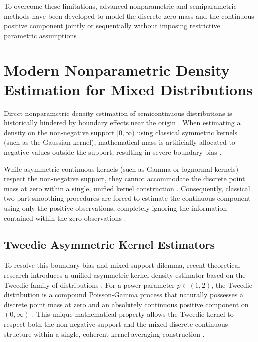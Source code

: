 To overcome these limitations, advanced nonparametric and semiparametric methods have been developed to model the discrete zero mass and the continuous positive component jointly or sequentially without imposing restrictive parametric assumptions \cite{tweedie_kde, neelon2010, zou2025fsdnn}.

\section{Modern Nonparametric Density Estimation for Mixed Distributions}

Direct nonparametric density estimation of semicontinuous distributions is historically hindered by boundary effects near the origin \cite{tweedie_kde, boundary_correction}. When estimating a density on the non-negative support $[0, \infty)$ using classical symmetric kernels (such as the Gaussian kernel), mathematical mass is artificially allocated to negative values outside the support, resulting in severe boundary bias \cite{boundary_correction}. 

While asymmetric continuous kernels (such as Gamma or lognormal kernels) respect the non-negative support, they cannot accommodate the discrete point mass at zero within a single, unified kernel construction \cite{tweedie_kde}. Consequently, classical two-part smoothing procedures are forced to estimate the continuous component using only the positive observations, completely ignoring the information contained within the zero observations \cite{tweedie_kde, boundary_correction}.

\subsection{Tweedie Asymmetric Kernel Estimators}

To resolve this boundary-bias and mixed-support dilemma, recent theoretical research introduces a unified asymmetric kernel density estimator based on the Tweedie family of distributions \cite{tweedie_kde, tweedie1984, dunn2005}. For a power parameter $p \in (1,2)$, the Tweedie distribution is a compound Poisson-Gamma process that naturally possesses a discrete point mass at zero and an absolutely continuous positive component on $(0, \infty)$ \cite{tweedie_kde, tweedie1984}. This unique mathematical property allows the Tweedie kernel to respect both the non-negative support and the mixed discrete-continuous structure within a single, coherent kernel-averaging construction \cite{tweedie_kde, boundary_correction}.

